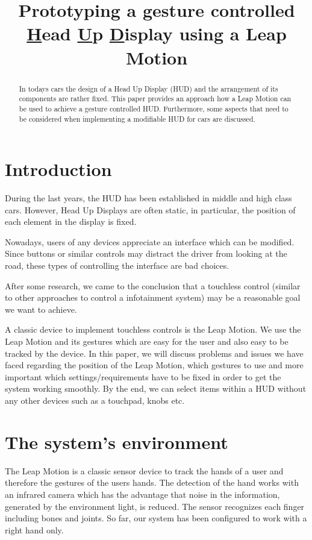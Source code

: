 \documentclass{sigchi-ext}
\title{Prototyping a gesture controlled \underline{H}ead \underline{U}p \underline{D}isplay using a Leap Motion}
\author{%
  \alignauthor{%
    \textbf{Daniel Brand}\\
    \affaddr{University of Salzburg} \\
    \affaddr{Salzburg, 5020, AUT} \\
    \email{Daniel.Brand@stud.sbg.ac.at} 
}
\alignauthor{%
    \textbf{Kevin B\"uchele}\\
    \affaddr{University of Salzburg}\\
    \affaddr{Salzburg, 5020, AUT}\\
    \email{Kevin.Buechele@stud.sbg.ac.at} 
} \vfil 
}
\begin{document}
\maketitle

\RaggedRight{} 

\begin{abstract}
In todays cars the design of a Head Up Display (HUD) and
the arrangement of its components are rather fixed. This paper provides an approach
how a Leap Motion can be used to achieve a gesture controlled HUD. Furthermore, some aspects that need to be considered
when implementing a modifiable HUD for cars are discussed.
\end{abstract}


\section{Introduction}
During the last years, the HUD has been established in middle and high class cars.
However, Head Up Displays are often static, in particular, the position of each element in the display
is fixed.

Nowadays, users of any devices appreciate an interface which can be modified.
Since buttons or similar controls may distract the driver from looking at the road,
these types of controlling the interface are bad choices.

After some research, we came to the conclusion that a touchless control
(similar to other approaches to control a infotainment system)
may be a reasonable goal we want to achieve.

A classic device to implement touchless controls is the Leap Motion. We use the Leap Motion
and its gestures which are easy for the user and also easy to be tracked by the device.
In this paper, we will discuss problems and issues we have faced regarding the position of
the Leap Motion, which gestures to use and more important which settings/requirements have to be fixed
in order to get the system working smoothly. By the end, we can select items within a HUD
without any other devices such as a touchpad, knobs etc.

\section{The system's environment}
The Leap Motion is a classic sensor device to track the hands of a user and therefore the gestures of the users hands.
The detection of the hand works with an infrared camera which has the advantage that noise in the information, generated by the environment light, 
is reduced. The sensor recognizes each finger including
bones and joints. So far, our system has been configured to work with a right hand only.
\end{document}
